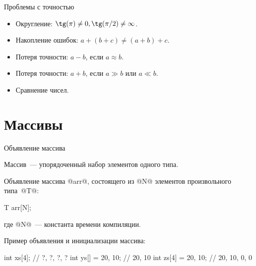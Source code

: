 \begin{frame}{Проблемы с точностью}

  \begin{itemize}[<+->]
    \item Округление: $\tg(\pi) \neq 0, \tg(\pi/2) \neq \infty$.
    \item Накопление ошибок:
      $a + (b + c) \neq (a + b) + c$.
    \item Потеря точности:
      $a - b$, если $a \approx b$.
    \item Потеря точности:
      $a + b$, если $a \gg b$ или $a \ll b$.
    \item Сравнение чисел.
  \end{itemize}


\end{frame}


\section{Массивы}

\begin{frame}[fragile]{Объявление массива}

  Массив~--- упорядоченный набор элементов одного типа.

  \pause
  Объявление массива @arr@, состоящего из @N@ элементов произвольного
  типа~@T@:
  \begin{clisting}
    T arr[N];
  \end{clisting}
  \revertListingParskip
  где @N@~--- константа времени компиляции.

  \pause
  Пример объявления и инициализации массива:
  \begin{clisting}
    int xs[4];            // {?, ?, ?, ?}
    int ys[]  = {20, 10}; // {20, 10}
    int zs[4] = {20, 10}; // {20, 10, 0, 0}
  \end{clisting}

\end{frame}

